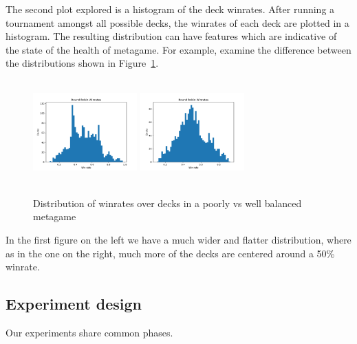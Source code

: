The second plot explored is a histogram of the deck winrates. After running a tournament amongst all possible decks, the winrates of each deck are plotted in a histogram. The resulting distribution can have features which are indicative of the state of the health of metagame. For example, examine the difference between the distributions shown in Figure~\ref{fig:special_only_dist}. 

\begin{figure}[t]
	\includegraphics[width=4cm, height=4cm]{special_only_4_5_8_8_4_8_3_3_3_5}
	\includegraphics[width=4cm, height=4cm]{special_only_1_3_4_3_3_1_7_8_5_7}
	\caption{Distribution of winrates over decks in a poorly vs well balanced metagame}
	\label{fig:special_only_dist}
\end{figure}

In the first figure on the left we have a much wider and flatter distribution, where as in the one on the right, much more of the decks are centered around a 50\% winrate. 

\subsection{Experiment design}


Our experiments share common phases.

